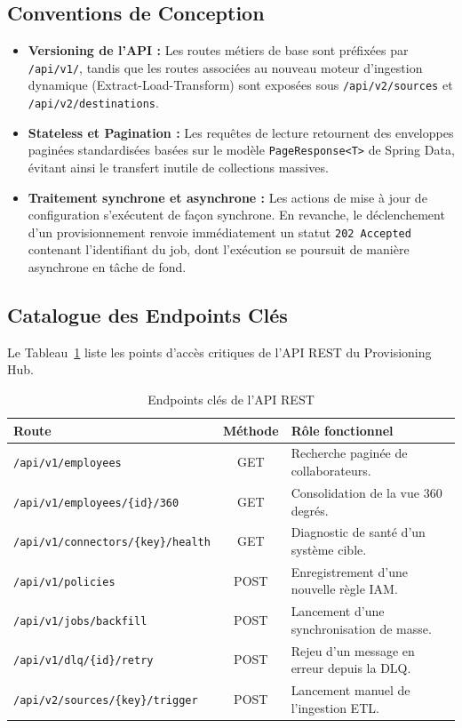 \subsection{Conventions de Conception}
\begin{itemize}
    \item \textbf{Versioning de l'API :} Les routes métiers de base sont préfixées par \texttt{/api/v1/}, tandis que les routes associées au nouveau moteur d'ingestion dynamique (Extract-Load-Transform) sont exposées sous \texttt{/api/v2/sources} et \texttt{/api/v2/destinations}.
    \item \textbf{Stateless et Pagination :} Les requêtes de lecture retournent des enveloppes paginées standardisées basées sur le modèle \texttt{PageResponse<T>} de Spring Data, évitant ainsi le transfert inutile de collections massives.
    \item \textbf{Traitement synchrone et asynchrone :} Les actions de mise à jour de configuration s'exécutent de façon synchrone. En revanche, le déclenchement d'un provisionnement renvoie immédiatement un statut \texttt{202 Accepted} contenant l'identifiant du job, dont l'exécution se poursuit de manière asynchrone en tâche de fond.
\end{itemize}

\subsection{Catalogue des Endpoints Clés}
Le Tableau~\ref{tab:catalogue_endpoints} liste les points d'accès critiques de l'API REST du Provisioning Hub.

\begin{table}[H]
    \centering
    \caption{Endpoints clés de l'API REST}
    \label{tab:catalogue_endpoints}
    \begin{tabular}{lcl}
        \toprule
        \textbf{Route} & \textbf{Méthode} & \textbf{Rôle fonctionnel} \\
        \midrule
        \texttt{/api/v1/employees} & GET & Recherche paginée de collaborateurs. \\
        \texttt{/api/v1/employees/\{id\}/360} & GET & Consolidation de la vue 360 degrés. \\
        \texttt{/api/v1/connectors/\{key\}/health} & GET & Diagnostic de santé d'un système cible. \\
        \texttt{/api/v1/policies} & POST & Enregistrement d'une nouvelle règle IAM. \\
        \texttt{/api/v1/jobs/backfill} & POST & Lancement d'une synchronisation de masse. \\
        \texttt{/api/v1/dlq/\{id\}/retry} & POST & Rejeu d'un message en erreur depuis la DLQ. \\
        \texttt{/api/v2/sources/\{key\}/trigger} & POST & Lancement manuel de l'ingestion ETL. \\
        \bottomrule
    \end{tabular}
\end{table}

